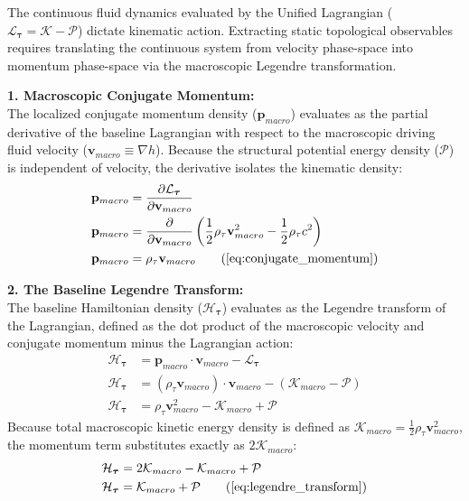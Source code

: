 \documentclass[11pt, a4paper]{article}
\begin{document}
The continuous fluid dynamics evaluated by the Unified Lagrangian ($\mathcal{L}_{\boldsymbol{\tau}} = \mathcal{K} - \mathcal{P}$) dictate kinematic action. Extracting static topological observables requires translating the continuous system from velocity phase-space into momentum phase-space via the macroscopic Legendre transformation.

\textbf{1. Macroscopic Conjugate Momentum:} \\
The localized conjugate momentum density ($\mathbf{p}_{macro}$) evaluates as the partial derivative of the baseline Lagrangian with respect to the macroscopic driving fluid velocity ($\mathbf{v}_{macro} \equiv \nabla h$). Because the structural potential energy density ($\mathcal{P}$) is independent of velocity, the derivative isolates the kinematic density:
\begin{align}
    \mathbf{p}_{macro} &= \frac{\partial \mathcal{L}_{\boldsymbol{\tau}}}{\partial \mathbf{v}_{macro}} \nonumber \\
    \mathbf{p}_{macro} &= \frac{\partial}{\partial \mathbf{v}_{macro}} \left( \frac{1}{2} \rho_{\tau} \mathbf{v}_{macro}^2 - \frac{1}{2} \rho_{\tau} c^2 \right) \nonumber \\
    \mathbf{p}_{macro} &= \rho_{\tau} \mathbf{v}_{macro} \tag{\ref{eq:conjugate_momentum}}
\end{align}

\textbf{2. The Baseline Legendre Transform:} \\
The baseline Hamiltonian density ($\mathcal{H}_{\boldsymbol{\tau}}$) evaluates as the Legendre transform of the Lagrangian, defined as the dot product of the macroscopic velocity and conjugate momentum minus the Lagrangian action:
\begin{align}
    \mathcal{H}_{\boldsymbol{\tau}} &= \mathbf{p}_{macro} \cdot \mathbf{v}_{macro} - \mathcal{L}_{\boldsymbol{\tau}} \nonumber \\
    \mathcal{H}_{\boldsymbol{\tau}} &= (\rho_{\tau} \mathbf{v}_{macro}) \cdot \mathbf{v}_{macro} - (\mathcal{K}_{macro} - \mathcal{P}) \nonumber \\
    \mathcal{H}_{\boldsymbol{\tau}} &= \rho_{\tau} \mathbf{v}_{macro}^2 - \mathcal{K}_{macro} + \mathcal{P} \nonumber
\end{align}
Because total macroscopic kinetic energy density is defined as $\mathcal{K}_{macro} = \frac{1}{2}\rho_{\tau} \mathbf{v}_{macro}^2$, the momentum term substitutes exactly as $2\mathcal{K}_{macro}$:
\begin{align}
    \mathcal{H}_{\boldsymbol{\tau}} &= 2\mathcal{K}_{macro} - \mathcal{K}_{macro} + \mathcal{P} \nonumber \\
    \mathcal{H}_{\boldsymbol{\tau}} &= \mathcal{K}_{macro} + \mathcal{P} \tag{\ref{eq:legendre_transform}}
\end{align}
\end{document}
